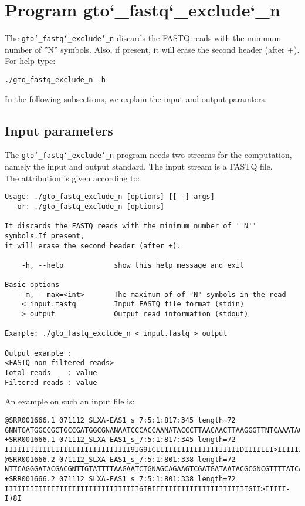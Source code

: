 \section{Program gto\char`_fastq\char`_exclude\char`_n}
The \texttt{gto\char`_fastq\char`_exclude\char`_n} discards the FASTQ reads with the minimum number of ''N'' symbols. Also, if present, it will erase the second header (after +).\\
For help type:
\begin{lstlisting}
./gto_fastq_exclude_n -h
\end{lstlisting}
In the following subsections, we explain the input and output paramters.

\subsection*{Input parameters}

The \texttt{gto\char`_fastq\char`_exclude\char`_n} program needs two streams for the computation,
namely the input and output standard. The input stream is a FASTQ file.\\
The attribution is given according to:
\begin{lstlisting}
Usage: ./gto_fastq_exclude_n [options] [[--] args]
   or: ./gto_fastq_exclude_n [options]

It discards the FASTQ reads with the minimum number of ''N'' symbols.If present,
it will erase the second header (after +).

    -h, --help            show this help message and exit

Basic options
    -m, --max=<int>       The maximum of of "N" symbols in the read
    < input.fastq         Input FASTQ file format (stdin)
    > output              Output read information (stdout)

Example: ./gto_fastq_exclude_n < input.fastq > output

Output example :
<FASTQ non-filtered reads>
Total reads    : value
Filtered reads : value
\end{lstlisting}
An example on such an input file is:
\begin{lstlisting}
@SRR001666.1 071112_SLXA-EAS1_s_7:5:1:817:345 length=72
GNNTGATGGCCGCTGCCGATGGCGNANAATCCCACCAANATACCCTTAACAACTTAAGGGTTNTCAAATAGA
+SRR001666.1 071112_SLXA-EAS1_s_7:5:1:817:345 length=72
IIIIIIIIIIIIIIIIIIIIIIIIIIIIII9IG9ICIIIIIIIIIIIIIIIIIIIIDIIIIIII>IIIIII/
@SRR001666.2 071112_SLXA-EAS1_s_7:5:1:801:338 length=72
NTTCAGGGATACGACGNTTGTATTTTAAGAATCTGNAGCAGAAGTCGATGATAATACGCGNCGTTTTATCAN
+SRR001666.2 071112_SLXA-EAS1_s_7:5:1:801:338 length=72
IIIIIIIIIIIIIIIIIIIIIIIIIIIIIIII6IBIIIIIIIIIIIIIIIIIIIIIIIGII>IIIII-I)8I
\end{lstlisting}

